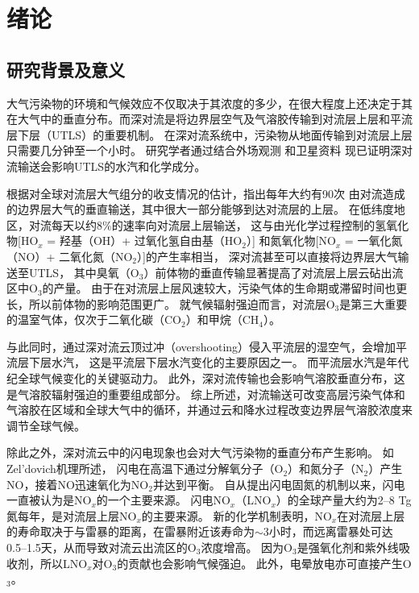 
\chapter{绪论}

\section{研究背景及意义}

大气污染物的环境和气候效应不仅取决于其浓度的多少，在很大程度上还决定于其在大气中的垂直分布。而深对流是将边界层空气及气溶胶传输到对流层上层和平流层下层（UTLS）的重要机制\citep{Chatfield.1984,Dickerson.1987,Pickering.1989,Yin.2002}。
在深对流系统中，污染物从地面传输到对流层上层只需要几分钟至一个小时\citep{Skamarock.2000}。
研究学者通过结合外场观测\citep{Dickerson.1987,Pickering.1996,Bertram.2007,Apel.2012,Pan.2017}
和卫星资料\citep{Halland.2009,Barth.2012,Livesey.2013,Jensen.2015}
现已证明深对流输送会影响UTLS的水汽和化学成分。

根据对全球对流层大气组分的收支情况的估计，\citet{Cotton.1995}指出每年大约有90次
由对流造成的边界层大气的垂直输送，其中很大一部分能够到达对流层的上层。
在低纬度地区，对流每天以约8\%的速率向对流层上层输送，
这与由光化学过程控制的氢氧化物[HO$_x$ = 羟基（OH）+ 过氧化氢自由基（HO$_2$）]
和氮氧化物[NO$_x$ = 一氧化氮（NO）+ 二氧化氮（NO$_2$）]的产生率相当，
深对流甚至可以直接将边界层大气输送至UTLS\citep{Prather.1997}，
其中臭氧（O$_3$）前体物的垂直传输显著提高了对流层上层云砧出流区中O$_3$的产量\citep{Pickering.1990,Pickering.1992,Pickering.1992a}。
由于在对流层上层风速较大，污染气体的生命期或滞留时间也更长，所以前体物的影响范围更广。
就气候辐射强迫而言，对流层O$_3$是第三大重要的温室气体\citep{Myhre.2013}，仅次于二氧化碳（CO$_2$）和甲烷（CH$_4$）。

与此同时，通过深对流云顶过冲（overshooting）侵入平流层的湿空气，会增加平流层下层水汽\citep{Homeyer.2014}，
这是平流层下层水汽变化的主要原因之一。
而平流层水汽是年代纪全球气候变化的关键驱动力\citep{Solomon.2010}。 此外，深对流传输也会影响气溶胶垂直分布，这是气溶胶辐射强迫的重要组成部分\citep{Mishra.2012,Park.2015}。
综上所述，对流输送可改变高层污染气体和气溶胶在区域和全球大气中的循环\citep{Clarisse.2011}，并通过云和降水过程改变边界层气溶胶浓度来调节全球气候\citep{Taylor.1997}。

除此之外，深对流云中的闪电现象也会对大气污染物的垂直分布产生影响。
如Zel'dovich机理所述\citep{Zeldovich.1967}，
闪电在高温下通过分解氧分子（O$_2$）和氮分子（N$_2$）产生NO，接着NO迅速氧化为NO$_2$并达到平衡。
自从\citet{Liebig.1827}提出闪电固氮的机制以来，闪电一直被认为是NO$_x$的一个主要来源\citep{Hutchinson.1954}。
闪电NO$_x$（LNO$_x$）的全球产量大约为2–8 Tg氮每年，是对流层上层NO$_x$的主要来源\citep{Galloway.2004,Schumann.2007}。
新的化学机制表明，NO$_x$在对流层上层的寿命取决于与雷暴的距离，在雷暴附近该寿命为$\sim$3小时，而远离雷暴处可达0.5--1.5天\citep{Nault.2016,Nault.2017}，从而导致对流云出流区的O$_3$浓度增高\citep{Pickering.1996,Hauglustaine.2001,DeCaria.2005}。
因为O$_3$是强氧化剂和紫外线吸收剂\citep{Myhre.2013}，所以LNO$_x$对O$_3$的贡献也会影响气候强迫。
此外，电晕放电亦可直接产生O$_3$\citep{Minschwaner.2008,Kotsakis.2017}。

